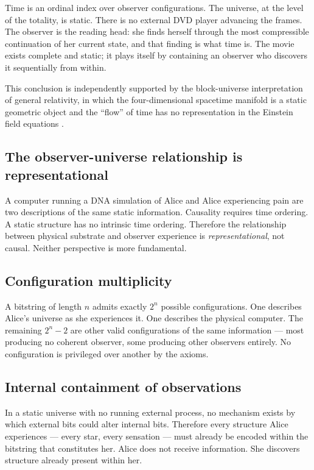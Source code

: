 \documentclass[12pt,a4paper]{article}
\begin{document}
Time is an ordinal index over observer configurations. The universe, at the
level of the totality, is static. There is no external DVD player advancing
the frames. The observer is the reading head: she finds herself through the
most compressible continuation of her current state, and that finding is what
time is. The movie exists complete and static; it plays itself by containing
an observer who discovers it sequentially from within.

This conclusion is independently supported by the block-universe interpretation
of general relativity, in which the four-dimensional spacetime manifold is a
static geometric object and the ``flow'' of time has no representation in the
Einstein field equations \cite{barbour1999}.

\subsection*{The observer-universe relationship is representational}

A computer running a DNA simulation of Alice and Alice experiencing pain are
two descriptions of the same static information. Causality requires time
ordering. A static structure has no intrinsic time ordering. Therefore the
relationship between physical substrate and observer experience is
\emph{representational}, not causal. Neither perspective is more fundamental.

\subsection*{Configuration multiplicity}

A bitstring of length $n$ admits exactly $2^n$ possible configurations. One
describes Alice's universe as she experiences it. One describes the physical
computer. The remaining $2^n - 2$ are other valid configurations of the same
information --- most producing no coherent observer, some producing other
observers entirely. No configuration is privileged over another by the axioms.

\subsection*{Internal containment of observations}
\label{subs:internal}

In a static universe with no running external process, no mechanism exists by
which external bits could alter internal bits. Therefore every structure Alice
experiences --- every star, every sensation --- must already be encoded within
the bitstring that constitutes her. Alice does not receive information. She
discovers structure already present within her.
\end{document}
